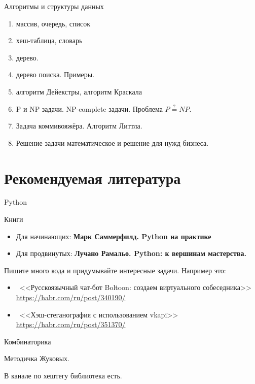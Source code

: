   \begin{frame}{Алгоритмы и структуры данных}
   \begin{enumerate}
   	
     \item массив, очередь, список
     \item хеш-таблица, словарь
     \item дерево.
     \item дерево поиска. Примеры.
     \item алгоритм Дейекстры, алгоритм Краскала
     \item P и NP задачи. NP-complete задачи. Проблема $ P\stackrel{?}{=} NP$.
     \item Задача коммивояжёра. Алгоритм Литтла.  
     \item Решение задачи математическое и решение для нужд бизнеса.   
	\end{enumerate}
	\end{frame}
  
  \section{Рекомендуемая литература}\label{section:literature}
  
  \begin{frame}{Python}
  
  Книги
  \begin{itemize}
  	\item Для начинающих: 
  	\textbf{Марк Саммерфилд. Python на практике} 
  	\item 
  	Для продвинутых:
  	\textbf{Лучано Рамальо. Python: к вершинам мастерства.}
  \end{itemize}
  
  Пишите много кода и придумывайте интересные задачи. 
  Например это:
  \begin{itemize}
  	\item ~<<Русскоязычный чат-бот Boltoon: создаем виртуального собеседника>>
  	\url{https://habr.com/ru/post/340190/}
  	\item ~<<Хэш-стеганография с использованием vkapi>>
  	\url{https://habr.com/ru/post/351370/}
  \end{itemize}
\end{frame}
	
	\begin{frame}{Комбинаторика}
	
	Методичка Жуковых. 
	
	В канале по хештегу библиотека есть.
	
	\end{frame}

